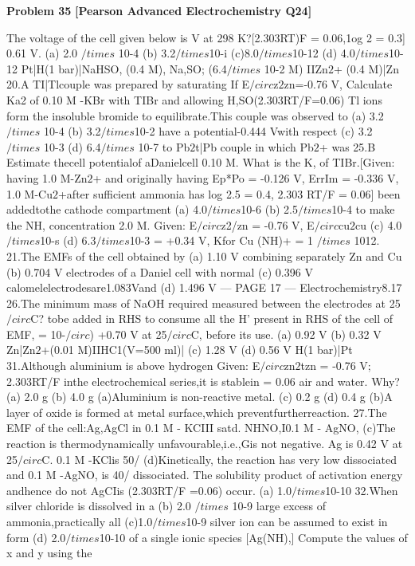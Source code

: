 \begin{problembox}
\textbf{Problem 35} \hfill \textbf{[Pearson Advanced Electrochemistry Q24]}
\label{q:ext-pearson-35}

The voltage of the cell given below is
V at 298 K?[2.303RT)F = 0.06,1og 2 = 0.3]
0.61 V.
(a) 2.0 $/times$ 10-4
(b) 3.2$/times$10-i
(c)8.0$/times$10-12
(d) 4.0$/times$10-12
Pt|H(1 bar)|NaHSO, (0.4 M), Na,SO;
(6.4$/times$ 10-2 M) IIZn$2$+ (0.4 M)|Zn
20.A TI|Tlcouple was prepared by saturating
If E$/circ$z$2$zn=-0.76 V, Calculate Ka2 of
0.10 M -KBr with TIBr and allowing
H,SO(2.303RT/F=0.06)
Tl ions form the insoluble bromide to
equilibrate.This couple was observed to
(a) 3.2 $/times$ 10-4
(b) 3.2$/times$10-2
have a potential-0.444 Vwith respect
(c) 3.2 $/times$ 10-3
(d) 6.4$/times$ 10-7
to Pb$2$t|Pb couple in which Pb$2$+ was
25.B
Estimate thecell potentialof aDanielcell
0.10 M. What is the K, of TIBr.[Given:
having 1.0 M-Zn$2$+ and originally having
Ep*Po = -0.126 V, ErrIm = -0.336 V,
1.0 M-Cu$2$+after sufficient ammonia has
log 2.5 = 0.4, 2.303 RT/F = 0.06]
been addedtothe cathode compartment
(a) 4.0$/times$10-6
(b) 2.5$/times$10-4
to make the NH, concentration 2.0 M.
Given: E$/circ$z2/zn = -0.76 V, E$/circ$cu$2$cu
(c) 4.0$/times$10-s
(d) 6.3$/times$10-3
= +0.34 V, Kfor Cu (NH)+ = 1 $/times$ 1012.
21.The EMFs of the cell obtained by
(a) 1.10 V
combining separately Zn and Cu
(b) 0.704 V
electrodes of a Daniel cell with normal
(c) 0.396 V
calomelelectrodesare1.083Vand
(d) 1.496 V
--- PAGE 17 ---
Electrochemistry8.17
26.The minimum mass of NaOH required
measured between the electrodes at 25$/circ$C?
tobe added in RHS to consume all the
H' present in RHS of the cell of EMF,
= 10-$/circ$)
+0.70 V at 25$/circ$C, before its use.
(a) 0.92 V
(b) 0.32 V
Zn|Zn$2$+(0.01 M)IIHC1(V=500 ml)|
(c) 1.28 V
(d) 0.56 V
H(1 bar)|Pt
31.Although aluminium is above hydrogen
Given: E$/circ$zn$2$tzn = -0.76 V; 2.303RT/F
inthe electrochemical series,it is stablein
= 0.06
air and water. Why?
(a) 2.0 g
(b) 4.0 g
(a)Aluminium is non-reactive metal.
(c) 0.2 g
(d) 0.4 g
(b)A layer of oxide is formed at metal
surface,which preventfurtherreaction.
27.The EMF of the cell:Ag,AgCl in 0.1 M
- KCIII satd. NHNO,I0.1 M - AgNO,
(c)The reaction is thermodynamically
unfavourable,i.e.,Gis not negative.
Ag is 0.42 V at 25$/circ$C. 0.1 M -KClis 50/%
(d)Kinetically, the reaction has very low
dissociated and 0.1 M -AgNO, is 40/%
dissociated. The solubility product of
activation energy andhence do not
AgCIis (2.303RT/F =0.06)
occur.
(a) 1.0$/times$10-10
32.When silver chloride is dissolved in a
(b) 2.0 $/times$ 10-9
large excess of ammonia,practically all
(c)1.0$/times$10-9
silver ion can be assumed to exist in form
(d) 2.0$/times$10-10
of a single ionic species [Ag(NH),]
Compute the values of x and y using the
\end{problembox}

